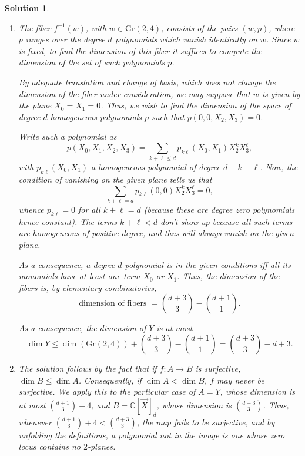 \documentclass{article}
\theoremstyle{nonumberplain}
\newtheorem{sol}{Solution}
\newcommand{\C}{\mathbb{C}}
\newcommand{\Gr}{\mathrm{Gr}}
\begin{document}
\begin{sol}
\leavevmode
\begin{enumerate}
\item The fiber $f^{-1}(w)$, with $w \in \Gr(2,4)$, consists of the pairs $(w,p)$, where $p$ ranges over the degree $d$ polynomials which vanish identically on $w$. Since $w$ is fixed, to find the dimension of this fiber it suffices to compute the dimension of the set of such polynomials $p$.

By adequate translation and change of basis, which does not change the dimension of the fiber under consideration, we may suppose that $w$ is given by the plane $X_0 = X_1 = 0$. Thus, we wish to find the dimension of the space of degree $d$ homogeneous polynomials $p$ such that $p(0,0,X_2,X_3) = 0$.

Write such a polynomial as
\begin{equation}
p(X_0,X_1,X_2,X_3) = \sum_{k+\ell \leq d} p_{k\ell}(X_0,X_1) X_2^k X_3^\ell,
\end{equation}
with $p_{k\ell}(X_0,X_1)$ a homogeneous polynomial of degree $d-k-\ell$. Now, the condition of vanishing on the given plane tells us that
\begin{equation}
\sum_{k+\ell=d} p_{k\ell}(0,0) X_2^k X_3^\ell = 0,
\end{equation}
whence $p_{k\ell} = 0$ for all $k+\ell = d$ (because these are degree zero polynomials hence constant). The terms $k+\ell < d$ don't show up because all such terms are homogeneous of positive degree, and thus will always vanish on the given plane.

As a consequence, a degree $d$ polynomial is in the given conditions iff all its monomials have at least one term $X_0$ or $X_1$. Thus, the dimension of the fibers is, by elementary combinatorics,
\begin{equation}
\text{dimension of fibers } = \binom{d+3}{3} - \binom{d+1}1.
\end{equation}

\smallskip

As a consequence, the dimension of $Y$ is at most
\begin{equation}
\dim Y \leq \dim(\Gr(2,4)) + \binom{d+3}{3} - \binom{d+1}1 = \binom{d+3}{3} - d + 3.
\end{equation}

\item The solution follows by the fact that if $f \colon A \to B$ is surjective, $\dim B \leq \dim A$. Consequently, if $\dim A < \dim B$, $f$ may never be surjective. We apply this to the particular case of $A = Y$, whose dimension is at most $\binom{d+1}3 + 4$, and $B = \C[\vec X]_d$, whose dimension is $\binom{d+3}3$. Thus, whenever $\binom{d+1}3 + 4 < \binom{d+3}3$, the map fails to be surjective, and by unfolding the definitions, a polynomial not in the image is one whose zero locus contains no $2$-planes.


\end{enumerate}
\end{sol}
\end{document}
